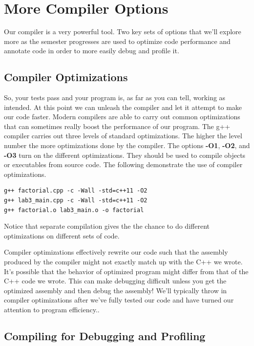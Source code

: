 \documentclass[]{tufte-handout}
\begin{document}
\section{More Compiler Options}

Our compiler is a very powerful tool. Two key sets of options that we'll explore more as the semester progresses are used to optimize code performance and annotate code in order to more easily debug and profile it. 
 
\subsection{Compiler Optimizations}

So, your tests pass and your program is, as far as you can tell, working as intended.  At this point we can unleash the compiler and let it attempt to make our code faster. Modern compilers are able to carry out common optimizations that can sometimes really boost the performance of our program. The g++ compiler carries out three levels of standard optimizations.  The higher the level number the more optimizations done by the compiler. The options \textbf{-O1}, \textbf{-O2}, and \textbf{-O3} turn on the different optimizations. They should be used to compile objects or executables from source code. The following demonstrate the use of compiler optimizations.
\begin{verbatim}
g++ factorial.cpp -c -Wall -std=c++11 -O2 
g++ lab3_main.cpp -c -Wall -std=c++11 -O2 
g++ factorial.o lab3_main.o -o factorial
\end{verbatim}
Notice that separate compilation gives the the chance to do different optimizations on different sets of code.  

Compiler optimizations effectively rewrite our code such that the assembly produced by the compiler might not exactly match up with the C++ we wrote.  It's possible that the behavior of optimized program might differ from that of the C++ code we wrote. This can make debugging difficult unless you get the optimized assembly and then debug the assembly! We'll typically throw in compiler optimizations after we've fully tested our code and have turned our attention to program efficiency..   


\subsection{Compiling for Debugging and Profiling}
\end{document}

